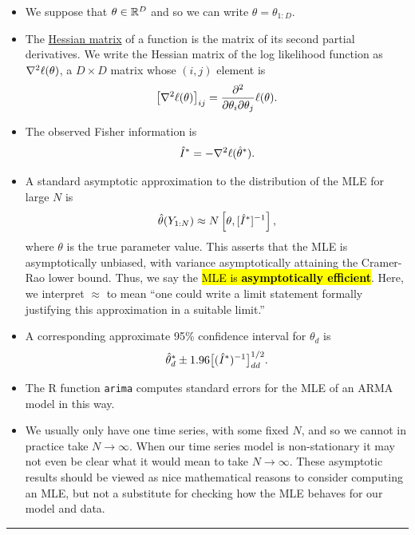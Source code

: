 \documentclass[]{article}
\begin{document}
\begin{itemize}
\item
  We suppose that \(\theta\in\mathbb{R}^D\) and so we can write
  \(\theta=\theta_{1:D}\).
\item
  The \href{https://en.wikipedia.org/wiki/Hessian_matrix}{Hessian
  matrix} of a function is the matrix of its second partial derivatives.
  We write the Hessian matrix of the log likelihood function as
  \(\nabla^2\ell(\theta)\), a \(D\times D\) matrix whose \((i,j)\)
  element is
  \[ \big[\nabla^2\ell(\theta)\big]_{ij} =  \frac{\partial^2}{\partial\theta_i\partial\theta_j}\ell(\theta).\]
\item
  The observed Fisher information is
  \[ \hat{I}^* = - \nabla^2\ell(\hat\theta^*).\]
  
  
\item
  A standard asymptotic approximation to the distribution of the MLE for
  large \(N\) is \[
  \hat\theta(Y_{1:N}) \approx N\left[\theta, [\hat{I}^*]^{-1}\right],
  \] where \(\theta\) is the true parameter value. This asserts that the
  MLE is asymptotically unbiased, with variance asymptotically attaining
  the Cramer-Rao lower bound. Thus, we say the \hl{MLE is
  \textbf{asymptotically efficient}}. Here, we interpret \(\approx\) to
  mean ``one could write a limit statement formally justifying this
  approximation in a suitable limit.''
\item
  A corresponding approximate 95\% confidence interval for \(\theta_d\)
  is
  \[ \hat\theta_d^* \pm 1.96 \big[({\hat{I}^*})^{-1}\big]_{dd}^{1/2}.\]
\item
  The R function \texttt{arima} computes standard errors for the MLE of
  an ARMA model in this way.
\item
  We usually only have one time series, with some fixed \(N\), and so we
  cannot in practice take \(N\to\infty\). When our time series model is
  non-stationary it may not even be clear what it would mean to take
  \(N\to\infty\). These asymptotic results should be viewed as nice
  mathematical reasons to consider computing an MLE, but not a
  substitute for checking how the MLE behaves for our model and data.
\end{itemize}

\begin{center}\rule{0.5\linewidth}{\linethickness}\end{center}
\end{document}
